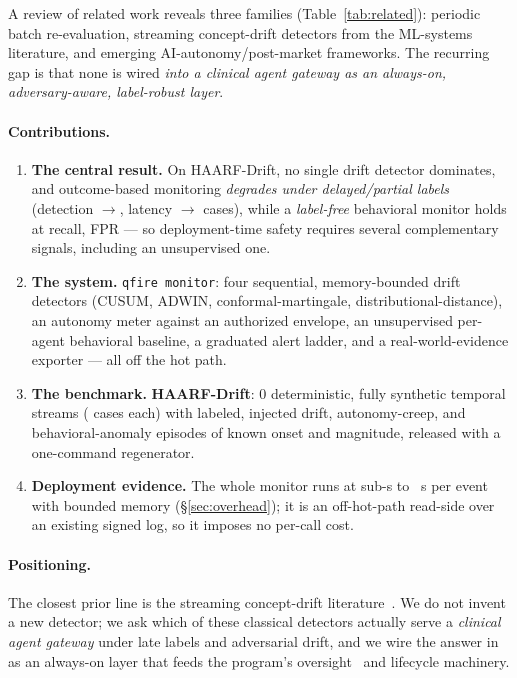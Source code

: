 \documentclass[11pt]{article}
\providecommand{\NumPrompts}{0}
\begin{document}
A review of related work reveals three families (Table~\ref{tab:related}): periodic
batch re-evaluation, streaming concept-drift detectors from the ML-systems literature,
and emerging AI-autonomy/post-market frameworks. The recurring gap is that none is wired
\emph{into a clinical agent gateway as an always-on, adversary-aware, label-robust layer}.

\paragraph{Contributions.}
\begin{enumerate}
  \item \textbf{The central result.} On HAARF-Drift, no single drift detector dominates,
  and outcome-based monitoring \emph{degrades under delayed/partial labels} (detection
  \EtwoFullRate{}$\to$\EtwoSparseRate{}, latency \EtwoFullLat{}$\to$\EtwoMaxLat{} cases),
  while a \emph{label-free} behavioral monitor holds at \BehRecall{} recall, \BehFPRop{}
  FPR --- so deployment-time safety requires several complementary signals, including an
  unsupervised one.
  \item \textbf{The system.} \texttt{qfire monitor}: four sequential, memory-bounded drift
  detectors (CUSUM, ADWIN, conformal-martingale, distributional-distance), an autonomy
  meter against an authorized envelope, an unsupervised per-agent behavioral baseline, a
  graduated alert ladder, and a real-world-evidence exporter --- all off the hot path.
  \item \textbf{The benchmark.} \textbf{HAARF-Drift}: \NumPrompts{} deterministic,
  fully synthetic temporal streams (\StreamLen{} cases each) with labeled, injected drift,
  autonomy-creep, and behavioral-anomaly episodes of known onset and magnitude, released
  with a one-command regenerator.
  \item \textbf{Deployment evidence.} The whole monitor runs at sub-\textmu s to
  \OvDist~\textmu s per event with bounded memory (\S\ref{sec:overhead}); it is an
  off-hot-path read-side over an existing signed log, so it imposes no per-call cost.
\end{enumerate}

\paragraph{Positioning.} The closest prior line is the streaming concept-drift
literature~\cite{page1954cusum,bifet2007adwin,gama2014survey,volkhonskiy2017conformal}.
We do not invent a new detector; we ask which of these classical detectors actually serve
a \emph{clinical agent gateway} under late labels and adversarial drift, and we wire the
answer in as an always-on layer that feeds the program's oversight~\cite{policy2026} and
lifecycle machinery.
\end{document}
